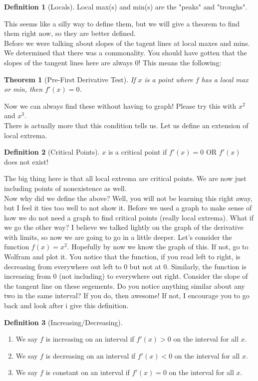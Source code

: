 \documentclass[10pt]{article}
\theoremstyle{Theorem}
\newtheorem{theorem}{Theorem}[section]
\theoremstyle{definition}
\newtheorem{definition}{Definition}[section]
\theoremstyle{remark}
\theoremstyle{custom}
\begin{document}
\begin{definition}[Locals]
Local  max(s) and min(s) are the "peaks" and "troughs".
\end{definition}
This seems like a silly way to define them, but we will give a theorem to find them right now, so they are better defined.\\
Before we were talking about slopes of the tagent lines at local maxes and mins. We determined that there was a commonality. You should have gotten that the slopes of the tangent lines here are always 0! This means the following:
\begin{theorem}[Pre-First Derivative Test]
If $x$ is a point where $f$ has a local max or min, then $f'(x)=0$.
\end{theorem}
Now we can always find these without having to graph! Please try this with $x^2$ and $x^3$.\\
There is actually more that this condition tells us. Let us define an extension of local extrema.
\begin{definition}[Critical Points]
$x$ is a critical point if $f'(x)=0$ OR $f'(x)$ does not exist! 
\end{definition}
The big thing here is that all local extrema are critical points. We are now just including points of nonexistence as well.\\
Now why did we define the above? Well, you will not be learning this right away, but I feel it ties too well to not show it. Before we used a graph to make sense of how we do not need a graph to find critical points (really local extrema). What if we go the other way? I believe we talked lightly on the graph of the derivative with limits, so now we are going to go in a little deeper. Let's consider the function $f(x)=x^2$. Hopefully by now we know the graph of this. If not, go to Wolfram and plot it. You notice that the function, if you read left to right, is decreasing from everywhere out left to 0 but not at 0. Similarly, the function is increasing from 0 (not including) to everywhere out right. Consider the slope of the tangent line on these segements. Do you notice anything similar about any two in the same interval? If you do, then awesome! If not, I encourage you to go back and look after i give this definition.
\begin{definition}[Increasing/Decreasing]
\begin{enumerate}[1.]
\item We say $f$ is increasing on an interval if $f'(x)>0$ on the interval for all $x$.
\item We say $f$ is decreasing on an interval if $f'(x)<0$ on the interval for all $x$.
\item We say $f$ is constant on an interval if $f'(x)=0$ on the interval for all $x$.
\end{enumerate}
\end{definition}
\end{document}
